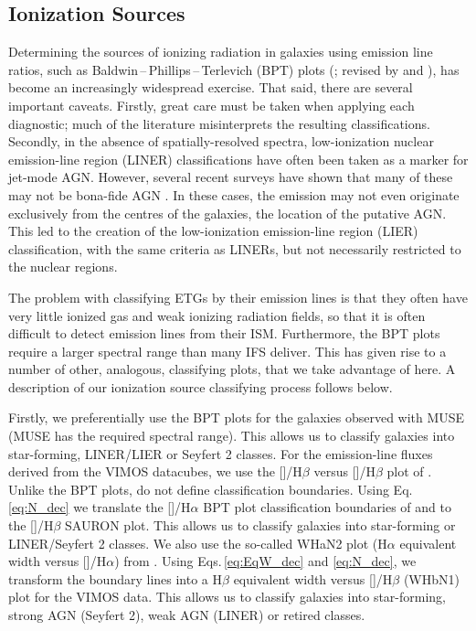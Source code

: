 \documentclass[a4paper,fleqn,usenatbib]{mnras}
\begin{document}
	\subsection{Ionization Sources}
		\label{subsec:Diagnostics}
		Determining the sources of ionizing radiation in galaxies using emission line ratios, such as Baldwin\,--\,Phillips\,--\,Terlevich (BPT) plots (\citealt{Baldwin1981}; revised by \citealt{Kewley2001, Kewley2006} and \citealt{Kauffmann2003a}), has become an increasingly widespread exercise. That said, there are several important caveats. Firstly, great care must be taken when applying each diagnostic; much of the literature misinterprets the resulting classifications. Secondly, in the absence of spatially-resolved spectra, low-ionization nuclear emission-line region (LINER) classifications have often been taken as a marker for jet-mode AGN. However, several recent surveys have shown that many of these may not be bona-fide AGN \citep[e.g.][]{Sarzi2005, Sarzi2010, Singh2013, Belfiore2016a}. In these cases, the emission may not even originate exclusively from the centres of the galaxies, the location of the putative AGN. This led to the creation of the low-ionization emission-line region (LIER) classification, with the same criteria as LINERs, but not necessarily restricted to the nuclear regions.

		The problem with classifying ETGs by their emission lines is that they often have very little ionized gas and weak ionizing radiation fields, so that it is often difficult to detect emission lines from their ISM. Furthermore, the BPT plots require a larger spectral range than many IFS deliver. This has given rise to a number of other, analogous, classifying plots, that we take advantage of here. A description of our ionization source classifying process follows below. 

		Firstly, we preferentially use the BPT plots for the galaxies observed with MUSE (MUSE has the required spectral range). This allows us to classify galaxies into star-forming, LINER/LIER or Seyfert 2 classes. For the emission-line fluxes derived from the VIMOS datacubes, we use the []/H$\beta$ versus []/H$\beta$ plot of \citet[hereafter the SAURON plot]{Sarzi2010}. Unlike the BPT plots, \citet{Sarzi2010} do not define classification boundaries. Using Eq.\,\ref{eq:N_dec} we translate the []/H$\alpha$ BPT plot classification boundaries of \citet{Kewley2001} and \citet{Kauffmann2003a} to the []/H$\beta$ SAURON plot. This allows us to classify galaxies into star-forming or LINER/Seyfert 2 classes. We also use the so-called WHaN2 plot (H$\alpha$ equivalent width versus []/H$\alpha$) from \citet{CidFernandes2011}. Using Eqs.\,\ref{eq:EqW_dec} and \ref{eq:N_dec}, we transform the boundary lines into a H$\beta$ equivalent width versus []/H$\beta$ (WHbN1) plot for the VIMOS data. This allows us to classify galaxies into star-forming, strong AGN (Seyfert 2), weak AGN (LINER) or retired classes. 
\end{document}
